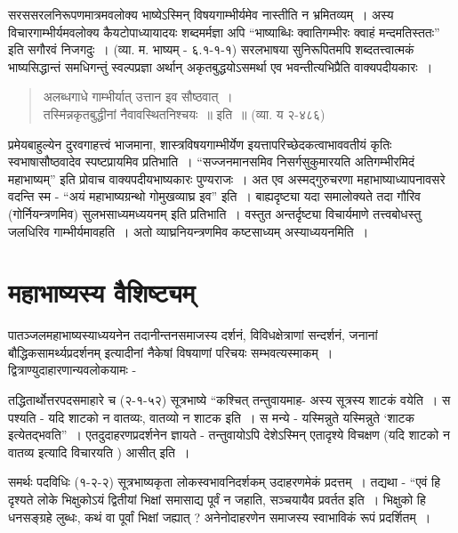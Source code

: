 {सरससरलनिरूपणमात्रमवलोक्य भाष्येऽस्मिन् विषयगाम्भीर्यमेव नास्तीति न भ्रमितव्यम्~। अस्य विचारगाम्भीर्यमवलोक्य कैयटोपाध्यायादयः शब्दमर्मज्ञा अपि “भाष्याब्धिः क्वातिगम्भीरः क्वाहं मन्दमतिस्ततः” इति सगौरवं निजगदुः~। (व्या. म. भाष्यम् - ६.१-१-१) सरलभाषया सुनिरूपितमपि शब्दतत्त्वात्मकं भाष्यसिद्धान्तं समधिगन्तुं स्वल्पप्रज्ञा अर्थान् अकृत\-बुद्धयोऽसमर्था एव भवन्तीत्यभिप्रैति वाक्यपदीयकारः~। 
\begin{verse}
अलब्धगाधे गाम्भीर्यात् उत्तान इव सौष्ठवात्~। \\
तस्मिन्नकृतबुद्धीनां नैवावस्थितनिश्चयः~॥ इति~॥ (व्या. य २-४८६)
\end{verse}
प्रमेयबाहुल्येन दुरवगाहत्त्वं भाजमाना, शास्त्रविषयगाम्भीर्येण इयत्तापरिच्छेदकत्वाभाववतीयं कृतिः स्वभाषासौष्ठवादेव स्पष्टप्रायमिव प्रतिभाति~। “सज्जनमानसमिव निसर्गसुकुमारयति अतिगम्भीरमिदं महाभाष्यम्” इति प्रोवाच वाक्यपदीयभाष्यकारः पुण्यराजः~। अत एव अस्मद्गुरुचरणा महाभाष्याध्यापनावसरे वदन्ति स्म - “अयं महाभाष्यग्रन्थो गोमुखव्याघ्र इव” इति~। बाह्यदृष्ट्या यदा समालोक्यते तदा गौरिव (गोर्नियन्त्रणमिव) सुलभसाध्यमध्ययनम् इति प्रतिभाति~। वस्तुत अन्तर्दृष्ट्या विचार्यमाणे तत्त्वबोधस्तु जलधिरिव गाम्भीर्यमावहति~। अतो व्याघ्रनियन्त्रणमिव कष्टसाध्यम् अस्याध्ययनमिति~। 

\section*{महाभाष्यस्य वैशिष्ट्यम्} 

पातञ्जलमहाभाष्यस्याध्ययनेन तदानीन्तनसमाजस्य दर्शनं, विविधक्षेत्राणां सन्दर्शनं, जनानां बौद्धिकसामर्थ्यप्रदर्शनम् इत्यादीनां नैकेषां विषयाणां परिचयः सम्भवत्यस्माकम्~। द्वित्राण्युदाहारणान्यवलोकयामः -

तद्धितार्थोत्तरपदसमाहारे च (२-१-५२) सूत्रभाष्ये “कश्चित् तन्तुवायमाह- अस्य सूत्रस्य शाटकं वयेति~। स पश्यति - यदि शाटको न वातव्यः, वातव्यो न शाटक इति~। स मन्ये - यस्मिन्नुते यस्मिन्नुते ‘शाटक इत्येतद्भवति”~। एतदुदाहरणप्रदर्शनेन ज्ञायते - तन्तुवायोऽपि देशेऽस्मिन् एतादृश्ये विचक्षण (यदि शाटको न वातव्य इत्यादि विचारयति ) आसीत् इति~। 

समर्थः पदविधिः (१-२-२) सूत्रभाष्यकृता लोकस्वभावनिदर्शकम् उदाहरणमेकं प्रदत्तम्~। तद्यथा - “एवं हि दृश्यते लोके भिक्षुकोऽयं द्वितीयां भिक्षां समासाद्य पूर्वं न जहाति, सञ्चयायैव प्रवर्तत इति~। भिक्षुको हि धनसङ्ग्रहे लुब्धः, कथं वा पूर्वां भिक्षां जह्यात् ? अनेनोदाहरणेन समाजस्य स्वाभाविकं रूपं प्रदर्शितम्~। 

}
